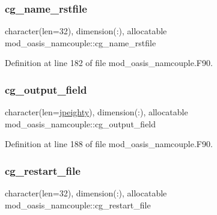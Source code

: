 \subsubsection{\texorpdfstring{cg\+\_\+name\+\_\+rstfile}{cg\_name\_rstfile}}
{\footnotesize\ttfamily character(len=32), dimension(\+:), allocatable mod\+\_\+oasis\+\_\+namcouple\+::cg\+\_\+name\+\_\+rstfile\hspace{0.3cm}{\ttfamily [private]}}



Definition at line 182 of file mod\+\_\+oasis\+\_\+namcouple.\+F90.

\mbox{\label{namespacemod__oasis__namcouple_a1b680bf476776f3db085dc1f0009736c}} 
\subsubsection{\texorpdfstring{cg\+\_\+output\+\_\+field}{cg\_output\_field}}
{\footnotesize\ttfamily character(len=\hyperlink{namespacemod__oasis__namcouple_a4fb10ad6e864dcbe34c4a8b02204a523}{jpeighty}), dimension(\+:), allocatable mod\+\_\+oasis\+\_\+namcouple\+::cg\+\_\+output\+\_\+field\hspace{0.3cm}{\ttfamily [private]}}



Definition at line 188 of file mod\+\_\+oasis\+\_\+namcouple.\+F90.

\mbox{\label{namespacemod__oasis__namcouple_a6eec7fe795bfb9c2058c7953c072d442}} 
\subsubsection{\texorpdfstring{cg\+\_\+restart\+\_\+file}{cg\_restart\_file}}
{\footnotesize\ttfamily character(len=32), dimension(\+:), allocatable mod\+\_\+oasis\+\_\+namcouple\+::cg\+\_\+restart\+\_\+file\hspace{0.3cm}{\ttfamily [private]}}



